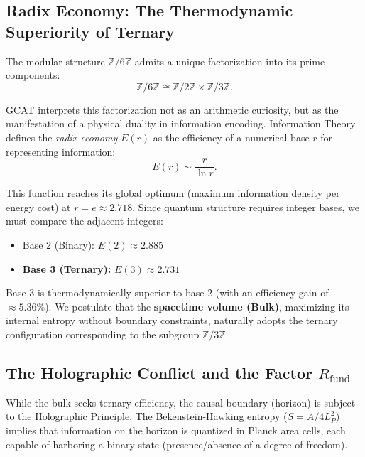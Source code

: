 \documentclass[12pt, a4paper]{article}
\theoremstyle{plain}
\theoremstyle{definition}
\begin{document}
\subsection{Radix Economy: The Thermodynamic Superiority of Ternary}

The modular structure $\mathbb{Z}/6\mathbb{Z}$ admits a unique factorization into its prime components:
\begin{equation}
\mathbb{Z}/6\mathbb{Z} \cong \mathbb{Z}/2\mathbb{Z} \times \mathbb{Z}/3\mathbb{Z}.
\label{eq:factorization}
\end{equation}

GCAT interprets this factorization not as an arithmetic curiosity, but as the manifestation of a physical duality in information encoding. Information Theory defines the \textit{radix economy} $E(r)$ as the efficiency of a numerical base $r$ for representing information:
\begin{equation}
E(r) \sim \frac{r}{\ln r}.
\end{equation}

This function reaches its global optimum (maximum information density per energy cost) at $r = e \approx 2.718$. Since quantum structure requires integer bases, we must compare the adjacent integers:
\begin{itemize}
    \item Base 2 (Binary): $E(2) \approx 2.885$
    \item \textbf{Base 3 (Ternary):} $E(3) \approx 2.731$
\end{itemize}

Base 3 is thermodynamically superior to base 2 (with an efficiency gain of $\approx 5.36\%$). We postulate that the \textbf{spacetime volume (Bulk)}, maximizing its internal entropy without boundary constraints, naturally adopts the ternary configuration corresponding to the subgroup $\mathbb{Z}/3\mathbb{Z}$.

\subsection{The Holographic Conflict and the Factor \texorpdfstring{$R_{\text{fund}}$}{Rfund}}

While the bulk seeks ternary efficiency, the causal boundary (horizon) is subject to the Holographic Principle. The Bekenstein-Hawking entropy ($S = A/4L_P^2$) implies that information on the horizon is quantized in Planck area cells, each capable of harboring a binary state (presence/absence of a degree of freedom).
\end{document}
